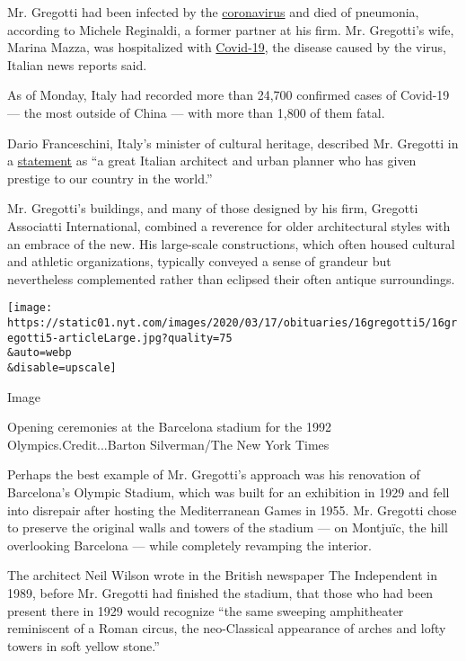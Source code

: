 Mr. Gregotti had been infected by the
\href{https://www.nytimes.com/news-event/coronavirus}{coronavirus} and
died of pneumonia, according to Michele Reginaldi, a former partner at
his firm. Mr. Gregotti's wife, Marina Mazza, was hospitalized with
\href{https://www.fda.gov/emergency-preparedness-and-response/mcm-issues/coronavirus-disease-2019-covid-19-frequently-asked-questions}{Covid-19},
the disease caused by the virus, Italian news reports said.

As of Monday, Italy had recorded more than 24,700 confirmed cases of
Covid-19 --- the most outside of China --- with more than 1,800 of them
fatal.

Dario Franceschini, Italy's minister of cultural heritage, described Mr.
Gregotti in a
\href{https://www.beniculturali.it/mibac/export/MiBAC/sito-MiBAC/Contenuti/MibacUnif/Comunicati/visualizza_asset.html_1827386555.html}{statement}
as ``a great Italian architect and urban planner who has given prestige
to our country in the world.''

Mr. Gregotti's buildings, and many of those designed by his firm,
Gregotti Associatti International, combined a reverence for older
architectural styles with an embrace of the new. His large-scale
constructions, which often housed cultural and athletic organizations,
typically conveyed a sense of grandeur but nevertheless complemented
rather than eclipsed their often antique surroundings.

\texttt{[image: https://static01.nyt.com/images/2020/03/17/obituaries/16gregotti5/16gregotti5-articleLarge.jpg?quality=75\\\&auto=webp\\\&disable=upscale]}

Image

Opening ceremonies at the Barcelona stadium for the 1992
Olympics.Credit...Barton Silverman/The New York Times

Perhaps the best example of Mr. Gregotti's approach was his renovation
of Barcelona's Olympic Stadium, which was built for an exhibition in
1929 and fell into disrepair after hosting the Mediterranean Games in
1955. Mr. Gregotti chose to preserve the original walls and towers of
the stadium --- on Montjuïc, the hill overlooking Barcelona --- while
completely revamping the interior.

The architect Neil Wilson wrote in the British newspaper The Independent
in 1989, before Mr. Gregotti had finished the stadium, that those who
had been present there in 1929 would recognize ``the same sweeping
amphitheater reminiscent of a Roman circus, the neo-Classical appearance
of arches and lofty towers in soft yellow stone.''

